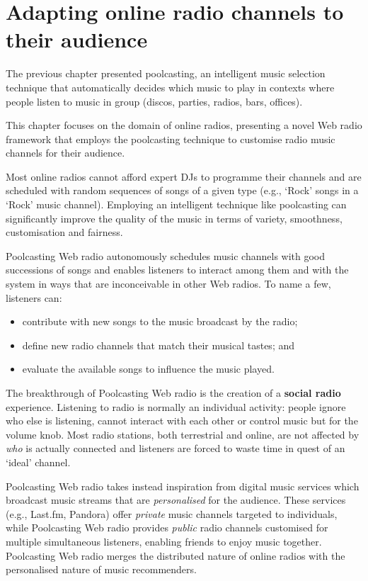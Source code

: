 \section{Adapting online radio channels to their audience} %
\label{sec:what_i_have_done}

The previous chapter presented poolcasting, an intelligent music selection technique that automatically decides which music to play in contexts where people listen to music in group (discos, parties, radios, bars, offices).
 
This chapter focuses on the domain of online radios, presenting a novel Web radio framework that employs the poolcasting technique to customise radio music channels for their audience.

Most online radios cannot afford expert DJs to programme their channels and are scheduled with random sequences of songs of a given type (e.g., `Rock' songs in a `Rock' music channel).
Employing an intelligent technique like poolcasting can significantly improve the quality of the music in terms of variety, smoothness, customisation and fairness.

Poolcasting Web radio autonomously schedules music channels with good successions of songs and enables listeners to interact among them and with the system in ways that are inconceivable in other Web radios.
To name a few, listeners can:
\begin{itemize}
 \item contribute with new songs to the music broadcast by the radio;
 \item define new radio channels that match their musical tastes; and
 \item evaluate the available songs to influence the music played.
\end{itemize}
%
The breakthrough of Poolcasting Web radio is the creation of a \textbf{social radio} experience.
Listening to radio is normally an individual activity: people ignore who else is listening, cannot interact with each other or control music but for the volume knob.
Most radio stations, both terrestrial and online, are not affected by \emph{who} is actually connected and listeners are forced to waste time in quest of an `ideal' channel.

Poolcasting Web radio takes instead inspiration from digital music services which broadcast music streams that are \emph{personalised} for the audience. 
These services (e.g., Last.fm, Pandora) offer \emph{private} music channels targeted to individuals, while Poolcasting Web radio provides \emph{public} radio channels customised for multiple simultaneous listeners, enabling friends to enjoy music together. %
Poolcasting Web radio merges the distributed nature of online radios with the personalised nature of music recommenders. 


